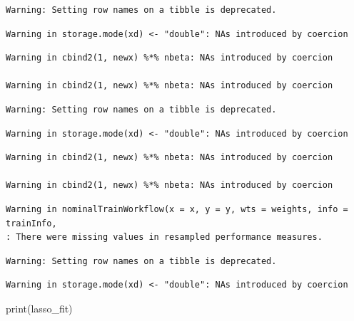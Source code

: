 \documentclass[
  letterpaper,
  DIV=11,
  numbers=noendperiod]{scrartcl}
\newenvironment{Shaded}{\begin{snugshade}}{\end{snugshade}}
\newcommand{\FunctionTok}[1]{\textcolor[rgb]{0.28,0.35,0.67}{#1}}
\newcommand{\NormalTok}[1]{\textcolor[rgb]{0.00,0.23,0.31}{#1}}
\begin{document}
\begin{verbatim}
Warning: Setting row names on a tibble is deprecated.
\end{verbatim}

\begin{verbatim}
Warning in storage.mode(xd) <- "double": NAs introduced by coercion
\end{verbatim}

\begin{verbatim}
Warning in cbind2(1, newx) %*% nbeta: NAs introduced by coercion

Warning in cbind2(1, newx) %*% nbeta: NAs introduced by coercion
\end{verbatim}

\begin{verbatim}
Warning: Setting row names on a tibble is deprecated.
\end{verbatim}

\begin{verbatim}
Warning in storage.mode(xd) <- "double": NAs introduced by coercion
\end{verbatim}

\begin{verbatim}
Warning in cbind2(1, newx) %*% nbeta: NAs introduced by coercion

Warning in cbind2(1, newx) %*% nbeta: NAs introduced by coercion
\end{verbatim}

\begin{verbatim}
Warning in nominalTrainWorkflow(x = x, y = y, wts = weights, info = trainInfo,
: There were missing values in resampled performance measures.
\end{verbatim}

\begin{verbatim}
Warning: Setting row names on a tibble is deprecated.
\end{verbatim}

\begin{verbatim}
Warning in storage.mode(xd) <- "double": NAs introduced by coercion
\end{verbatim}

\begin{Shaded}
\begin{Highlighting}[]
\FunctionTok{print}\NormalTok{(lasso\_fit)}
\end{Highlighting}
\end{Shaded}
\end{document}
